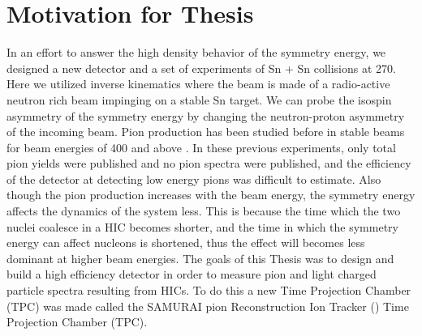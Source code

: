 \section{Motivation for Thesis}
In an effort to answer the high density behavior of the symmetry energy, we designed a new detector and a set of experiments of Sn + Sn collisions at \SI{270}{\MeVA}. Here we utilized inverse kinematics where the beam is made of a radio-active neutron rich beam impinging on a stable Sn target. We can probe the isospin asymmetry of the symmetry energy by changing the neutron-proton asymmetry of the incoming beam. Pion production has been studied before in stable beams for beam energies of \SI{400}{\MeVA} and above \cite{fopi}. In these previous experiments, only total pion yields were published and no pion spectra were published, and the efficiency of the detector at detecting low energy pions was difficult to estimate.  Also though the pion production increases with the beam energy, the symmetry energy affects the dynamics of the system less. This is because the time which the two nuclei coalesce in a HIC becomes shorter, and the time in which the symmetry energy can affect nucleons is shortened, thus the effect will becomes less dominant at higher beam energies.  The goals of this Thesis was to design and build a high efficiency detector in order to measure pion and light charged particle spectra resulting from HICs. To do this a new Time Projection Chamber (TPC) was made called the SAMURAI pion Reconstruction Ion Tracker (\spirit) Time Projection Chamber (TPC).





